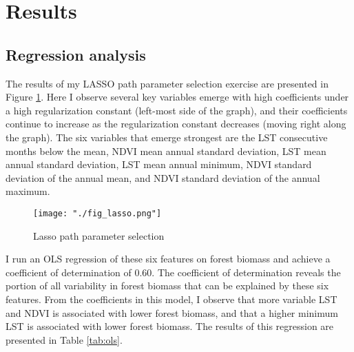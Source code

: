 \documentclass{article}
\begin{document}
\section{Results}
\label{sec:results}

\subsection{Regression analysis}
The results of my LASSO path parameter selection exercise are presented in Figure \ref{fig:lasso}. Here I observe several key variables emerge with high coefficients under a high regularization constant (left-most side of the graph), and their coefficients continue to increase as the regularization constant decreases (moving right along the graph). The six variables that emerge strongest are the LST consecutive months below the mean, NDVI mean annual standard deviation, LST mean annual standard deviation, LST mean annual minimum, NDVI standard deviation of the annual mean, and NDVI standard deviation of the annual maximum. 

\begin{figure}[!htbp]
  \centering
  \texttt{[image: "./fig\_lasso.png"]}
  \caption{\label{fig:lasso} Lasso path parameter selection}
\end{figure}

I run an OLS regression of these six features on forest biomass and achieve a coefficient of determination of 0.60. The coefficient of determination reveals the portion of all variability in forest biomass that can be explained by these six features. From the coefficients in this model, I observe that more variable LST and NDVI is associated with lower forest biomass, and that a higher minimum LST is associated with lower forest biomass. The results of this regression are presented in Table \ref{tab:ols}.
\end{document}

